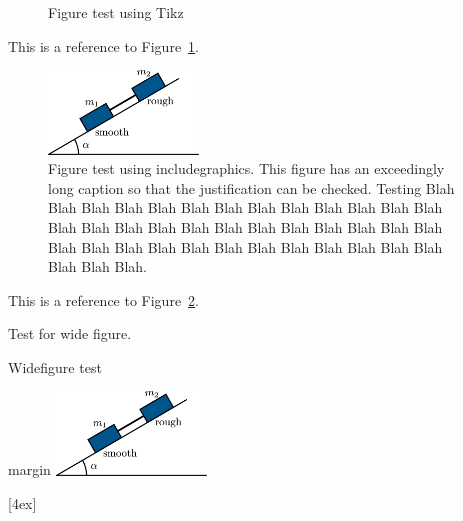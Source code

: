 \documentclass[solutionsatend]{ouunit}
\begin{document}
\begin{figure}
\caption{Figure test using Tikz}
\label{fig-test-tikz}
\end{figure}

This is a reference to Figure~\ref{fig-test-tikz}.

\begin{figure}
\caption{Figure test using includegraphics\label{fig-test-includegraphics}. This figure has an exceedingly long caption so that the justification can be checked. Testing Blah Blah Blah Blah Blah Blah Blah Blah Blah Blah Blah Blah Blah Blah Blah Blah Blah Blah Blah Blah Blah Blah Blah Blah Blah Blah Blah Blah Blah Blah Blah Blah Blah Blah Blah Blah Blah Blah Blah Blah.}
\includegraphics[width=4cm]{test}
\end{figure}

This is a reference to Figure~\ref{fig-test-includegraphics}.

Test for wide figure.

\begin{widefigure}
\caption{Widefigure test\label{fig-test-widefigure-one}}
\end{widefigure}


\lipsum[134]
\begin{marginfigure*}
\fboxsep 0pt%
\begin{outikzfig}[figurebox]{margin}
\includegraphics[width=4cm]{test}
\end{outikzfig}
\end{marginfigure*}
[4ex]
\end{document}
